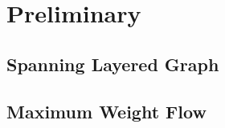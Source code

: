 \section{Preliminary}
\label{sec:carpool:preliminary}

\subsection{Spanning Layered Graph}


\subsection{Maximum Weight Flow}


